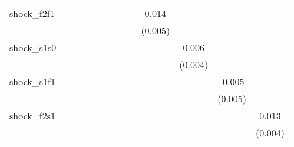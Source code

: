 {\begin{tabular}{l*{12}{c}}
\addlinespace
shock\_f2f1  &                     &                     &                     &                     &                     &                     &                     &                     &       0.014\sym{***}&                     &                     &                     \\
            &                     &                     &                     &                     &                     &                     &                     &                     &     (0.005)         &                     &                     &                     \\
\addlinespace
shock\_s1s0  &                     &                     &                     &                     &                     &                     &                     &                     &                     &       0.006\sym{*}  &                     &                     \\
            &                     &                     &                     &                     &                     &                     &                     &                     &                     &     (0.004)         &                     &                     \\
\addlinespace
shock\_s1f1  &                     &                     &                     &                     &                     &                     &                     &                     &                     &                     &      -0.005         &                     \\
            &                     &                     &                     &                     &                     &                     &                     &                     &                     &                     &     (0.005)         &                     \\
\addlinespace
shock\_f2s1  &                     &                     &                     &                     &                     &                     &                     &                     &                     &                     &                     &       0.013\sym{***}\\
            &                     &                     &                     &                     &                     &                     &                     &                     &                     &                     &                     &     (0.004)         \\

\end{tabular}}
